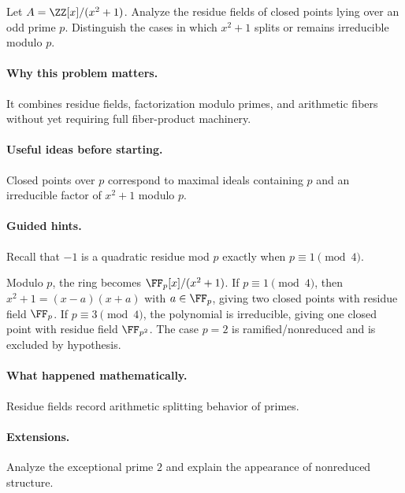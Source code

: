 \begin{problem}
Let $A=\ZZ[x]/(x^2+1)$.  Analyze the residue fields of closed points lying over an odd prime $p$.  Distinguish the cases in which $x^2+1$ splits or remains irreducible modulo $p$.
\end{problem}

\paragraph{Why this problem matters.}
It combines residue fields, factorization modulo primes, and arithmetic fibers without yet requiring full fiber-product machinery.

\paragraph{Useful ideas before starting.}
Closed points over $p$ correspond to maximal ideals containing $p$ and an irreducible factor of $x^2+1$ modulo $p$.

\paragraph{Guided hints.}
Recall that $-1$ is a quadratic residue mod $p$ exactly when $p\equiv1\pmod4$.

\begin{solution}
Modulo $p$, the ring becomes $\FF_p[x]/(x^2+1)$.  If $p\equiv1\pmod4$, then $x^2+1=(x-a)(x+a)$ with $a\in\FF_p$, giving two closed points with residue field $\FF_p$.  If $p\equiv3\pmod4$, the polynomial is irreducible, giving one closed point with residue field $\FF_{p^2}$.  The case $p=2$ is ramified/nonreduced and is excluded by hypothesis.
\end{solution}

\paragraph{What happened mathematically.}
Residue fields record arithmetic splitting behavior of primes.

\paragraph{Extensions.}
Analyze the exceptional prime $2$ and explain the appearance of nonreduced structure.

